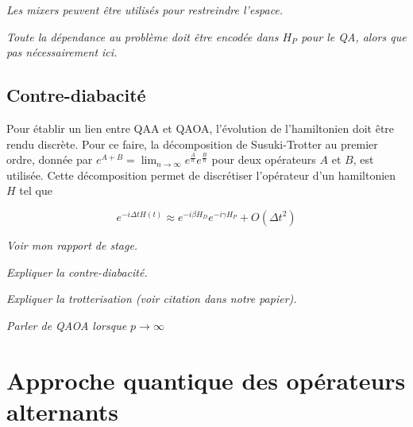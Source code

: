 \textcolor{mydarkred}{\textit{Les mixers peuvent être utilisés pour restreindre l'espace.}}


\textcolor{mydarkred}{\textit{Toute la dépendance au problème doit être encodée dans $H_P$ pour le QA, alors que pas nécessairement ici.}}


\subsection{Contre-diabacité}

Pour établir un lien entre QAA et QAOA, l'évolution de l'hamiltonien doit être rendu discrète. Pour ce faire, la décomposition de Susuki-Trotter au premier ordre, donnée par $e^{A+B} = \lim_{n \to \infty} e^{\frac{A}{n}} e^{\frac{B}{n}}$ pour deux opérateurs $A$ et $B$, est utilisée. Cette décomposition permet de discrétiser l'opérateur d'un hamiltonien $H$ tel que

\begin{equation}
    e^{-i\Delta t H(t)} \approx e^{-i \beta H_D} e^{-i \gamma H_P} + O(\Delta t^2)
\end{equation}

\textcolor{mydarkred}{\textit{Voir mon rapport de stage.}}

\textcolor{mydarkred}{\textit{Expliquer la contre-diabacité.}}

\textcolor{mydarkred}{\textit{Expliquer la trotterisation (voir citation dans notre papier).}}

\textcolor{mydarkred}{\textit{Parler de QAOA lorsque $p \to \infty$}}



\section{Approche quantique des opérateurs alternants}

